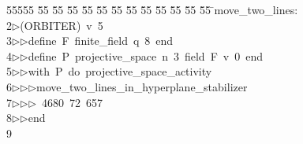 %
%
\begin{tabbing}
55555 \= 55 \= 55 \= 55 \= 55 \= 55 \= 55 \= 55 \= 55 \= 55 \= 55 \= 55 \= 55 \= \>move\_two\_lines:\\[0pt]
2\>$\triangleright$\>(ORBITER)\ v\ 5\ \\[0pt]
3\>$\triangleright$\>$\triangleright$\>define\ F\ finite\_field\ q\ 8\ end\ \\[0pt]
4\>$\triangleright$\>$\triangleright$\>define\ P\ projective\_space\ n\ 3\ field\ F\ v\ 0\ end\ \\[0pt]
5\>$\triangleright$\>$\triangleright$\>with\ P\ do\ projective\_space\_activity\ \\[0pt]
6\>$\triangleright$\>$\triangleright$\>$\triangleright$\>move\_two\_lines\_in\_hyperplane\_stabilizer\ \\[0pt]
7\>$\triangleright$\>$\triangleright$\>$\triangleright$\ 4680\ 72\ 657\ \\[0pt]
8\>$\triangleright$\>$\triangleright$\>end\\[0pt]
9\>\end{tabbing}
